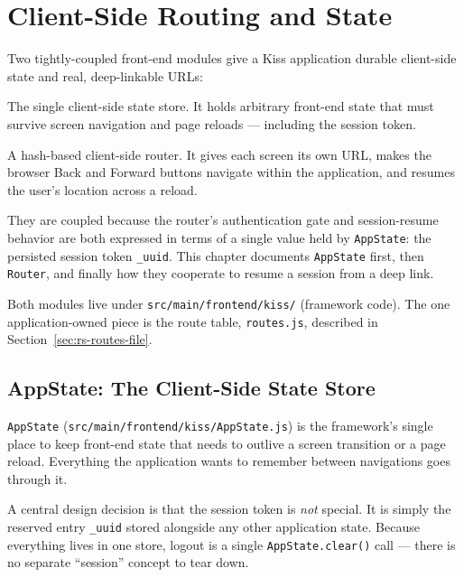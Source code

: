 \chapter{Client-Side Routing and State}
\label{ch:routing-state}

Two tightly-coupled front-end modules give a Kiss application durable client-side state and real, deep-linkable URLs:

\begin{description}[style=nextline]
  \item[\texttt{AppState}\index{AppState}] The single client-side state store.  It holds arbitrary front-end state that must survive screen navigation and page reloads --- including the session token.
  \item[\texttt{Router}\index{Router}] A hash-based client-side router.  It gives each screen its own URL, makes the browser Back and Forward buttons navigate within the application, and resumes the user's location across a reload.
\end{description}

They are coupled because the router's authentication gate and session-resume behavior are both expressed in terms of a single value held by \texttt{AppState}: the persisted session token \texttt{\_uuid}.  This chapter documents \texttt{AppState} first, then \texttt{Router}, and finally how they cooperate to resume a session from a deep link.

Both modules live under \texttt{src/main/frontend/kiss/} (framework code).  The one application-owned piece is the route table, \texttt{routes.js}, described in Section~\ref{sec:rs-routes-file}.

\section{AppState: The Client-Side State Store}
\label{sec:rs-appstate}

\texttt{AppState} (\texttt{src/main/frontend/kiss/AppState.js}) is the framework's single place to keep front-end state that needs to outlive a screen transition or a page reload.  Everything the application wants to remember between navigations goes through it.

A central design decision is that the session token is \emph{not} special.  It is simply the reserved entry \texttt{\_uuid} stored alongside any other application state.  Because everything lives in one store, logout is a single \texttt{AppState.clear()} call --- there is no separate ``session'' concept to tear down.

